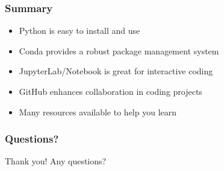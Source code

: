 \documentclass{beamer}
\begin{document}
\begin{frame}
    \frametitle{Summary}
    \begin{itemize}
        \item Python is easy to install and use
        \item Conda provides a robust package management system
        \item JupyterLab/Notebook is great for interactive coding
        \item GitHub enhances collaboration in coding projects
        \item Many resources available to help you learn
    \end{itemize}
\end{frame}

\begin{frame}
    \frametitle{Questions?}
    \begin{center}
        Thank you! Any questions?
    \end{center}
\end{frame}
\end{document}
